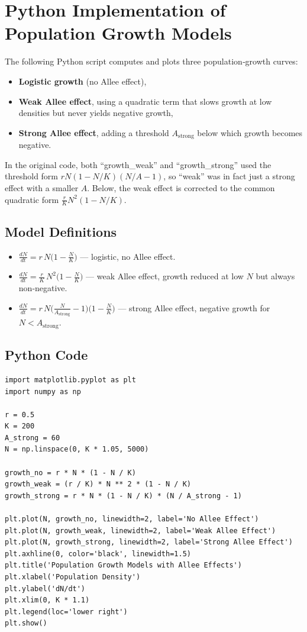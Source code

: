 \documentclass{article}
\begin{document}
\section{Python Implementation of Population Growth Models}

The following Python script computes and plots three population‐growth curves:
\begin{itemize}
  \item \textbf{Logistic growth} (no Allee effect),
  \item \textbf{Weak Allee effect}, using a quadratic term that slows growth at low densities but never yields negative growth,
  \item \textbf{Strong Allee effect}, adding a threshold \(A_\text{strong}\) below which growth becomes negative.
\end{itemize}

In the original code, both “growth\_weak” and “growth\_strong” used the threshold form 
\(\displaystyle rN(1 - N/K)(N/A - 1)\), so “weak” was in fact just a strong effect with a smaller \(A\).  
Below, the weak effect is corrected to the common quadratic form
\(\displaystyle \tfrac{r}{K}N^2(1 - N/K)\).

\subsection{Model Definitions}
\begin{itemize}
  \item \(\displaystyle\frac{dN}{dt} = r\,N\bigl(1 - \tfrac{N}{K}\bigr)\)  
        — logistic, no Allee effect.
  \item \(\displaystyle\frac{dN}{dt} = \frac{r}{K}\,N^2\bigl(1 - \tfrac{N}{K}\bigr)\)  
        — weak Allee effect, growth reduced at low \(N\) but always non‐negative.
  \item \(\displaystyle\frac{dN}{dt} = r\,N\bigl(\tfrac{N}{A_\text{strong}} - 1\bigr)\bigl(1 - \tfrac{N}{K}\bigr)\)  
        — strong Allee effect, negative growth for \(N < A_\text{strong}\).
\end{itemize}

\subsection{Python Code}
\begin{lstlisting}[caption={Analyze simulation results (Calculation part)}]
import matplotlib.pyplot as plt
import numpy as np

r = 0.5
K = 200
A_strong = 60
N = np.linspace(0, K * 1.05, 5000)

growth_no = r * N * (1 - N / K)
growth_weak = (r / K) * N ** 2 * (1 - N / K)
growth_strong = r * N * (1 - N / K) * (N / A_strong - 1)

plt.plot(N, growth_no, linewidth=2, label='No Allee Effect')
plt.plot(N, growth_weak, linewidth=2, label='Weak Allee Effect')
plt.plot(N, growth_strong, linewidth=2, label='Strong Allee Effect')
plt.axhline(0, color='black', linewidth=1.5)
plt.title('Population Growth Models with Allee Effects')
plt.xlabel('Population Density')
plt.ylabel('dN/dt')
plt.xlim(0, K * 1.1)
plt.legend(loc='lower right')
plt.show()
\end{lstlisting}
\end{document}
